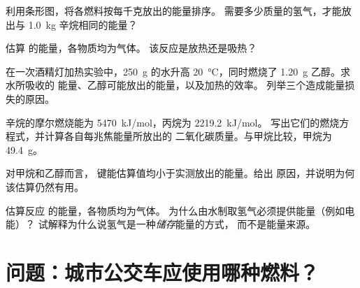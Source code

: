 \begin{exercise}[$\star\star$]\label{exo:g11:reaction-energy:10}
利用条形图，将各燃料按每千克放出的能量排序。
需要多少质量的氢气，才能放出与 \qty{1.0}{kg} 辛烷相同的能量？
\end{exercise}

\begin{exercise}[$\star\star$]\label{exo:g11:reaction-energy:11}
估算  的能量，各物质均为气体。
该反应是放热还是吸热？
\end{exercise}

\begin{exercise}[$\star\star\star$]\label{exo:g11:reaction-energy:12}
在一次酒精灯加热实验中，\qty{250}{g} 的水升高 
\qty{20}{\celsius}，同时燃烧了 \qty{1.20}{g} 乙醇。求水所吸收的
能量、乙醇可能放出的能量，以及加热的效率。
列举三个造成能量损失的原因。
\end{exercise}

\begin{exercise}[$\star\star\star$]\label{exo:g11:reaction-energy:13}
辛烷的摩尔燃烧能为 \qty{5470}{kJ/mol}，丙烷为 \qty{2219.2}{kJ/mol}。
写出它们的燃烧方程式，并计算各自每兆焦能量所放出的
二氧化碳质量。与甲烷比较，甲烷为 \qty{49.4}{g}。
\end{exercise}

\begin{exercise}[$\star\star\star$]\label{exo:g11:reaction-energy:14}
对甲烷和乙醇而言，
键能估算值均小于实测放出的能量。给出
原因，并说明为何该估算仍然有用。
\end{exercise}

\begin{exercise}[$\star\star\star$]\label{exo:g11:reaction-energy:15}
估算反应  的能量，各物质均为气体。
为什么由水制取氢气必须提供能量（例如电能）？
试解释为什么说氢气是一种\emph{储存}能量的方式，
而不是能量来源。
\end{exercise}

\section{问题：城市公交车应使用哪种燃料？}

